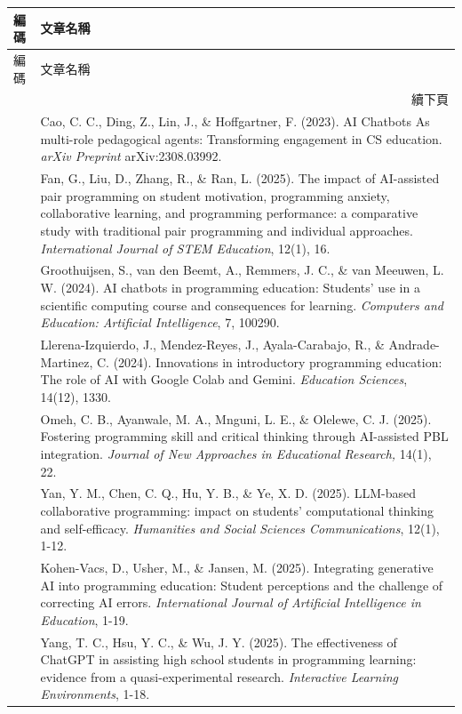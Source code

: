 \begin{longtable}{p{} p{}}
\toprule
編碼 & 文章名稱 \\
\midrule
\endfirsthead
\toprule
編碼 & 文章名稱 \\
\midrule
\endhead
\midrule
\multicolumn{2}{r}{續下頁} \\
\endfoot
\bottomrule
\endlastfoot
\cite{cao2023chatbots} & Cao, C. C., Ding, Z., Lin, J., \& Hoffgartner, F. (2023). AI Chatbots As multi-role pedagogical agents: Transforming engagement in CS education. \textit{arXiv Preprint} arXiv:2308.03992. \\
\cite{fan2025pair} & Fan, G., Liu, D., Zhang, R., \& Ran, L. (2025). The impact of AI-assisted pair programming on student motivation, programming anxiety, collaborative learning, and programming performance: a comparative study with traditional pair programming and individual approaches. \textit{International Journal of STEM Education}, 12(1), 16. \\
\cite{groothuijsen2024chatbots} & Groothuijsen, S., van den Beemt, A., Remmers, J. C., \& van Meeuwen, L. W. (2024). AI chatbots in programming education: Students' use in a scientific computing course and consequences for learning. \textit{Computers and Education: Artificial Intelligence}, 7, 100290. \\
\cite{llerena2024introductory} & Llerena-Izquierdo, J., Mendez-Reyes, J., Ayala-Carabajo, R., \& Andrade-Martinez, C. (2024). Innovations in introductory programming education: The role of AI with Google Colab and Gemini. \textit{Education Sciences}, 14(12), 1330. \\
\cite{omeh2025pbl} & Omeh, C. B., Ayanwale, M. A., Mnguni, L. E., \& Olelewe, C. J. (2025). Fostering programming skill and critical thinking through AI-assisted PBL integration. \textit{Journal of New Approaches in Educational Research,} 14(1), 22. \\
\cite{yan2025llm} & Yan, Y. M., Chen, C. Q., Hu, Y. B., \& Ye, X. D. (2025). LLM-based collaborative programming: impact on students' computational thinking and self-efficacy. \textit{Humanities and Social Sciences Communications}, 12(1), 1-12. \\
\cite{kohen2025integrating} & Kohen-Vacs, D., Usher, M., \& Jansen, M. (2025). Integrating generative AI into programming education: Student perceptions and the challenge of correcting AI errors. \textit{International Journal of Artificial Intelligence in Education}, 1-19. \\
\cite{yang2025chatgpt} & Yang, T. C., Hsu, Y. C., \& Wu, J. Y. (2025). The effectiveness of ChatGPT in assisting high school students in programming learning: evidence from a quasi-experimental research. \textit{Interactive Learning Environments}, 1-18. \\

\end{longtable}
